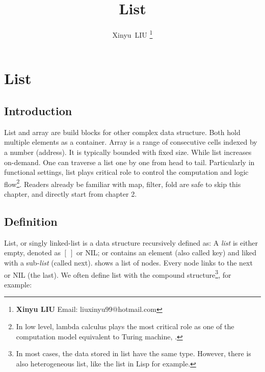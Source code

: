 \documentclass[b5paper]{article}
\begin{document}
\title{List}

\author{Xinyu~LIU
\thanks{{\bfseries Xinyu LIU} \newline
  Email: liuxinyu99@hotmail.com \newline}
  }

\maketitle
\fi


\ifx\wholebook\relax
\chapter{List}
\fi

\section{Introduction}
\label{introduction}

List and array are build blocks for other complex data structure. Both hold multiple elements as a container. Array is a range of consecutive cells indexed by a number (address). It is typically bounded with fixed size. While list increases on-demand. One can traverse a list one by one from head to tail. Particularly in functional settings, list plays critical role to control the computation and logic flow\footnote{In low level, lambda calculus plays the most critical role as one of the computation model equivalent to Turing machine\cite{mittype}, \cite{unplugged}.}. Readers already be familiar with map, filter, fold are safe to skip this chapter, and directly start from chapter 2.

\section{Definition}

List, or singly linked-list is a data structure recursively defined as: A {\em list} is either empty, denoted as $[\ ]$ or NIL; or contains an element (also called key) and liked with a sub-{\em list} (called next).  shows a list of nodes. Every node links to the next or NIL (the last). We often define list with the compound structure\footnote{In most cases, the data stored in list have the same type. However, there is also heterogeneous list, like the list in Lisp for example.}, for example:
\end{document}

